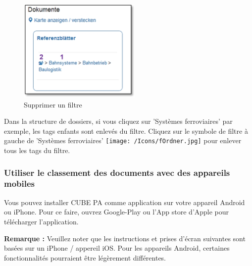 \pagebreak

\begin{figure}   %
  \vspace{-30pt}      %
  \begin{center}
    \includegraphics[height=50mm]{../chapters/11_Dokumentenablage/pictures/11-htag_FilterLoeschen.jpg}
  \end{center}
  \vspace{-20pt}
  \caption{Supprimer un filtre}
  \vspace{-10pt}
\end{figure}
Dans la structure de dossiers, si vous cliquez sur 'Systèmes ferroviaires'  par exemple, les tags enfants sont enlevés du filtre. Cliquez sur le symbole de filtre à gauche de 'Systèmes ferroviaires' \texttt{[image: /Icons/fOrdner.jpg]}  pour enlever tous les tags du filtre.

\vspace{\baselineskip}
\vspace{\baselineskip}
\vspace{\baselineskip}
\vspace{\baselineskip}

\subsubsection{Utiliser le classement des documents avec des appareils mobiles}

Vous pouvez installer CUBE PA comme application sur votre appareil Android ou iPhone. Pour ce faire, ouvrez Google-Play ou l'App store d'Apple pour télécharger l'application.

\vspace{\baselineskip}

\textbf{Remarque :} Veuillez noter que les instructions et prises d'écran suivantes sont basées sur un iPhone / appereil iOS. Pour les appareils Android, certaines fonctionnalités pourraient être légèrement différentes.

